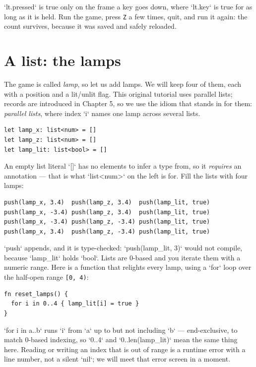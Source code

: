\noindent
`lt.pressed` is true only on the frame a key goes down, where `lt.key` is
true for as long as it is held. Run the game, press \texttt{Z} a few times,
quit, and run it again: the count survives, because it was saved and safely
reloaded.

\section{A list: the lamps}

The game is called \emph{lamp}, so let us add lamps. We will keep four of
them, each with a position and a lit/unlit flag. This original tutorial uses parallel lists; records are introduced in Chapter 5,
so we use the idiom that stands in for them: \emph{parallel lists}, where
index `i` names one lamp across several lists.

\begin{lstlisting}[language=wick]
let lamp_x: list<num> = []
let lamp_z: list<num> = []
let lamp_lit: list<bool> = []
\end{lstlisting}

\noindent
An empty list literal `[]` has no elements to infer a type from, so it
\emph{requires} an annotation --- that is what `list<num>` on the left is for.
Fill the lists with four lamps:

\begin{lstlisting}[language=wick]
push(lamp_x, 3.4)  push(lamp_z, 3.4)  push(lamp_lit, true)
push(lamp_x, -3.4) push(lamp_z, 3.4)  push(lamp_lit, true)
push(lamp_x, -3.4) push(lamp_z, -3.4) push(lamp_lit, true)
push(lamp_x, 3.4)  push(lamp_z, -3.4) push(lamp_lit, true)
\end{lstlisting}

\noindent
`push` appends, and it is type-checked: `push(lamp_lit, 3)` would not compile,
because `lamp_lit` holds `bool`. Lists are 0-based and you iterate them with a
numeric range. Here is a function that relights every lamp, using a `for` loop
over the half-open range \texttt{[0, 4)}:

\begin{lstlisting}[language=wick]
fn reset_lamps() {
  for i in 0..4 { lamp_lit[i] = true }
}
\end{lstlisting}

\noindent
`for i in a..b` runs `i` from `a` up to but not including `b` --- end-exclusive,
to match 0-based indexing, so `0..4` and `0..len(lamp_lit)` mean the same
thing here. Reading or writing an index that is out of range is a runtime
error with a line number, not a silent `nil`; we will meet that error screen
in a moment.

